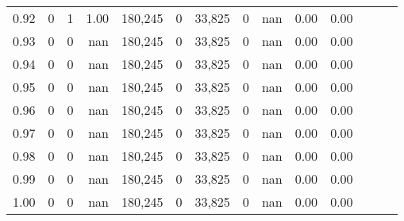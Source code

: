\begin{tabular}{rrrrrrrrrrrrrr}
0.92 &      0 &      1 &  1.00 &  180,245 &        0 &  33,825 &       0 &   nan &  0.00 &      0.00 \\
0.93 &      0 &      0 &   nan &  180,245 &        0 &  33,825 &       0 &   nan &  0.00 &      0.00 \\
0.94 &      0 &      0 &   nan &  180,245 &        0 &  33,825 &       0 &   nan &  0.00 &      0.00 \\
0.95 &      0 &      0 &   nan &  180,245 &        0 &  33,825 &       0 &   nan &  0.00 &      0.00 \\
0.96 &      0 &      0 &   nan &  180,245 &        0 &  33,825 &       0 &   nan &  0.00 &      0.00 \\
0.97 &      0 &      0 &   nan &  180,245 &        0 &  33,825 &       0 &   nan &  0.00 &      0.00 \\
0.98 &      0 &      0 &   nan &  180,245 &        0 &  33,825 &       0 &   nan &  0.00 &      0.00 \\
0.99 &      0 &      0 &   nan &  180,245 &        0 &  33,825 &       0 &   nan &  0.00 &      0.00 \\
1.00 &      0 &      0 &   nan &  180,245 &        0 &  33,825 &       0 &   nan &  0.00 &      0.00 \\
\bottomrule
\end{tabular}
